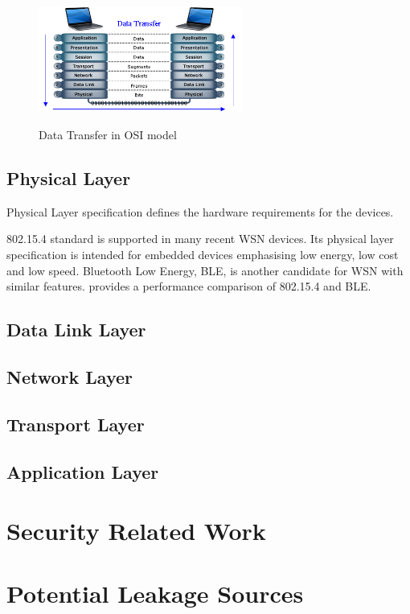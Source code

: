 \begin{figure}
\centering
{
	\includegraphics[width=0.6\textwidth,]{fig/Osi-model.png}
}
\caption{Data Transfer in OSI model} \label{fig: OSI channel}
\end{figure}

\subsection{Physical Layer}
Physical Layer specification defines the hardware requirements for the devices. 

802.15.4\cite{802154} standard is supported in many recent WSN devices. Its physical layer specification is intended for embedded devices emphasising low energy, low cost and low speed. Bluetooth Low Energy, BLE, is another candidate for WSN with similar features. \cite{802154BLE} provides a performance comparison of 802.15.4 and BLE.

\subsection{Data Link Layer}

\subsection{Network Layer}

\subsection{Transport Layer}

\subsection{Application Layer}

%
%

\section{Security Related Work}

\section{Potential Leakage Sources}